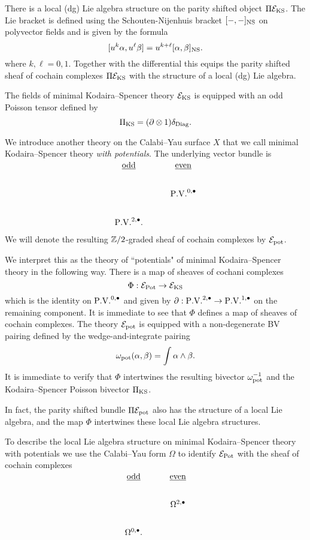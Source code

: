 \documentclass[11pt]{amsart}
\begin{document}
There is a local (dg) Lie algebra structure on the parity shifted object $\Pi \mathcal E_{\rm KS}$.
The Lie bracket is defined using the Schouten-Nijenhuis bracket $[-,-]_{\rm NS}$ on polyvector fields and is given by the formula
\[
[u^k \alpha , u^\ell \beta] = u^{k+\ell} [\alpha, \beta]_{\rm NS} .
\]
where $k, \ell = 0,1$.
Together with the differential this equips the parity shifted sheaf of cochain complexes $\Pi \mathcal E_{\rm KS}$ with the structure of a local (dg) Lie algebra.

The fields of minimal Kodaira--Spencer theory $\mathcal E_{\rm KS}$ is equipped with an odd Poisson tensor defined by
\[
\Pi_{\rm KS} = (\partial \otimes 1) \delta_{\rm Diag} .
\]

We introduce another theory on the Calabi--Yau surface $X$ that we call minimal Kodaira--Spencer theory {\em with potentials}.
The underlying vector bundle is
\[
\begin{tikzcd}
\ul{\rm odd} & \ul{\rm even} \\
 & \PV^{0,\bu} \\
 \PV^{2,\bu}  .
\end{tikzcd}
\]
We will denote the resulting $\mathbb Z /2$-graded sheaf of cochain complexes by $\mathcal E_{\rm pot}$.

We interpret this as the theory of  ``potentials"  of minimal Kodaira--Spencer theory in the following way.
There is a map of sheaves of cochani complexes
\[
\Phi : \mathcal E_{\rm Pot} \to \mathcal E_{\rm KS}
\]
which is the identity on $\PV^{0,\bu}$ and given by $\partial : \PV^{2,\bu} \to \PV^{1,\bu}$ on the remaining component.
It is immediate to see that $\Phi$ defines a map of sheaves of cochain complexes.
The theory $\mathcal E_{\rm pot}$ is equipped with a non-degenerate BV pairing defined by the wedge-and-integrate pairing
\[
\omega_{\rm pot} (\alpha, \beta) = \int \alpha \wedge \beta  .
\]
It is immediate to verify that $\Phi$ intertwines the resulting bivector $\omega_{\rm pot}^{-1}$ and the Kodaira--Spencer Poisson bivector $\Pi_{\rm KS}$.

In fact, the parity shifted bundle $\Pi \mathcal E_{\rm pot}$ also has the structure of a local Lie algebra, and the map $\Phi$ intertwines these local Lie algebra structures.

To describe the local Lie algebra structure on minimal Kodaira--Spencer theory with potentials we use the Calabi--Yau form $\Omega$ to identify $\mathcal E_{\rm Pot}$ with the sheaf of cochain complexes
\[
\begin{tikzcd}
\ul{\rm odd} & \ul{\rm even} \\
 & \Omega^{2,\bu} \\
 \Omega^{0,\bu}  .
\end{tikzcd}
\]
\end{document}
